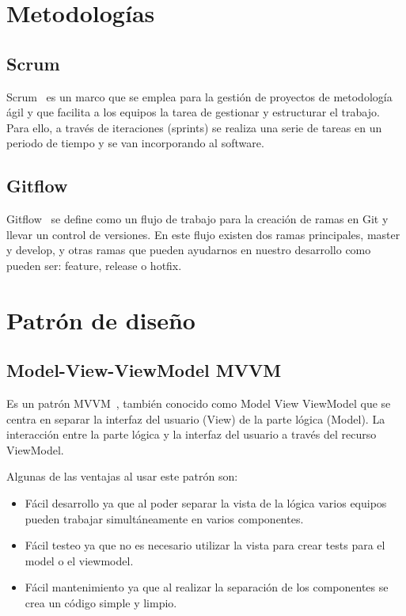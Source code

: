 \section{Metodologías}
\subsection{Scrum}
Scrum~\cite{wiki:scrum} es un marco que se emplea para la gestión de proyectos de metodología ágil y que facilita a los equipos la tarea de gestionar y estructurar el trabajo. Para ello, a través de iteraciones (sprints) se realiza una serie de tareas en un periodo de tiempo y se van incorporando al software.

\subsection{Gitflow}
Gitflow~\cite{gitflow} se define como un flujo de trabajo para la creación de ramas en Git y llevar un control de versiones. En este flujo existen dos ramas principales, master y develop, y otras ramas que pueden ayudarnos en nuestro desarrollo como pueden ser: feature, release o  hotfix.

\section{Patrón de diseño}
\subsection{Model-View-ViewModel MVVM}
Es un patrón MVVM~\cite{mvvm}, también conocido como Model View ViewModel que se centra en separar la interfaz del usuario (View) de la parte lógica (Model). La interacción entre la parte lógica y la interfaz del usuario a través del recurso ViewModel.

Algunas de las ventajas al usar este patrón son:
\begin{itemize}
\item Fácil desarrollo ya que al poder separar la vista de la lógica varios equipos pueden trabajar simultáneamente en varios componentes.
\item Fácil testeo ya que no es necesario utilizar la vista para crear tests para el model o el viewmodel.
\item Fácil mantenimiento ya que al realizar la separación de los componentes se crea un código simple y limpio.
\end{itemize}


